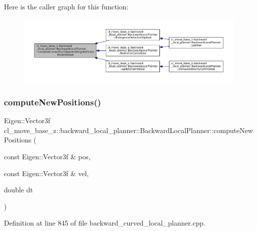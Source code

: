 Here is the caller graph for this function\+:
\nopagebreak
\begin{figure}[H]
\begin{center}
\leavevmode
\includegraphics[width=350pt]{classcl__move__base__z_1_1backward__local__planner_1_1BackwardLocalPlanner_ad39ba029c760fc63ea286c74b5b9b795_icgraph}
\end{center}
\end{figure}
\mbox{\label{classcl__move__base__z_1_1backward__local__planner_1_1BackwardLocalPlanner_a0fe2ebd23fd79e8b574127e819ef0e14}} 
\subsubsection{\texorpdfstring{compute\+New\+Positions()}{computeNewPositions()}}
{\footnotesize\ttfamily Eigen\+::\+Vector3f cl\+\_\+move\+\_\+base\+\_\+z\+::backward\+\_\+local\+\_\+planner\+::\+Backward\+Local\+Planner\+::compute\+New\+Positions (\begin{DoxyParamCaption}\item[{const Eigen\+::\+Vector3f \&}]{pos,  }\item[{const Eigen\+::\+Vector3f \&}]{vel,  }\item[{double}]{dt }\end{DoxyParamCaption})\hspace{0.3cm}{\ttfamily [private]}}



Definition at line 845 of file backward\+\_\+curved\+\_\+local\+\_\+planner.\+cpp.



